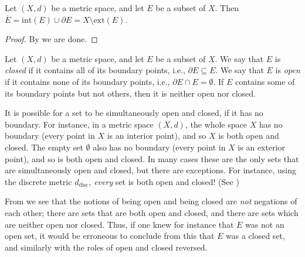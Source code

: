 \begin{cor}\label{ii:1.2.11}
  Let \((X, d)\) be a metric space, and let \(E\) be a subset of \(X\).
  Then \(\overline{E} = \text{int}(E) \cup \partial E = X \setminus \text{ext}(E)\).
\end{cor}

\begin{proof}
  By  we are done.
\end{proof}

\begin{defn}\label{ii:1.2.12}
  Let \((X, d)\) be a metric space, and let \(E\) be a subset of \(X\).
  We say that \(E\) is \emph{closed} if it contains all of its boundary points, i.e., \(\partial E \subseteq E\).
  We say that \(E\) is \emph{open} if it contains none of its boundary points, i.e., \(\partial E \cap E = \emptyset\).
  If \(E\) contains some of its boundary points but not others, then it is neither open nor closed.
\end{defn}

\setcounter{thm}{13}
\begin{rmk}\label{ii:1.2.14}
  It is possible for a set to be simultaneously open and closed, if it has no boundary.
  For instance, in a metric space \((X, d)\), the whole space \(X\) has no boundary (every point in \(X\) is an interior point), and so \(X\) is both open and closed.
  The empty set \(\emptyset\) also has no boundary (every point in \(X\) is an exterior point), and so is both open and closed.
  In many cases these are the only sets that are simultaneously open and closed, but there are exceptions.
  For instance, using the discrete metric \(d_{\text{disc}}\), \emph{every} set is both open and closed! (See )
\end{rmk}

\begin{note}
  From  we see that the notions of being open and being closed are \emph{not} negations of each other;
  there are sets that are both open and closed, and there are sets which are neither open nor closed.
  Thus, if one knew for instance that \(E\) was not an open set, it would be erroneous to conclude from this that \(E\) was a closed set, and similarly with the roles of open and closed reversed.
\end{note}


